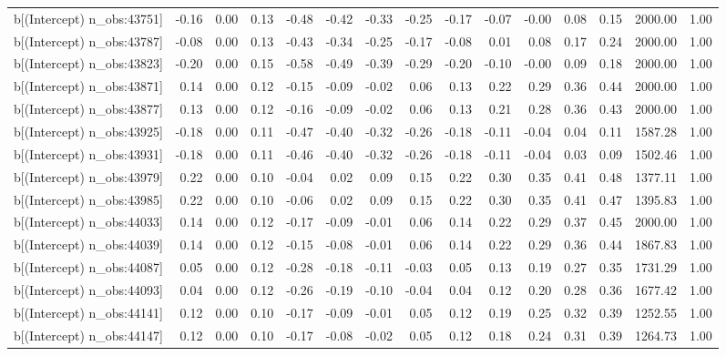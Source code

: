 \begin{table}[ht]
\begin{tabular}{rrrrrrrrrrrrrrr}
  b[(Intercept) n\_obs:43751] & -0.16 & 0.00 & 0.13 & -0.48 & -0.42 & -0.33 & -0.25 & -0.17 & -0.07 & -0.00 & 0.08 & 0.15 & 2000.00 & 1.00 \\ 
  b[(Intercept) n\_obs:43787] & -0.08 & 0.00 & 0.13 & -0.43 & -0.34 & -0.25 & -0.17 & -0.08 & 0.01 & 0.08 & 0.17 & 0.24 & 2000.00 & 1.00 \\ 
  b[(Intercept) n\_obs:43823] & -0.20 & 0.00 & 0.15 & -0.58 & -0.49 & -0.39 & -0.29 & -0.20 & -0.10 & -0.00 & 0.09 & 0.18 & 2000.00 & 1.00 \\ 
  b[(Intercept) n\_obs:43871] & 0.14 & 0.00 & 0.12 & -0.15 & -0.09 & -0.02 & 0.06 & 0.13 & 0.22 & 0.29 & 0.36 & 0.44 & 2000.00 & 1.00 \\ 
  b[(Intercept) n\_obs:43877] & 0.13 & 0.00 & 0.12 & -0.16 & -0.09 & -0.02 & 0.06 & 0.13 & 0.21 & 0.28 & 0.36 & 0.43 & 2000.00 & 1.00 \\ 
  b[(Intercept) n\_obs:43925] & -0.18 & 0.00 & 0.11 & -0.47 & -0.40 & -0.32 & -0.26 & -0.18 & -0.11 & -0.04 & 0.04 & 0.11 & 1587.28 & 1.00 \\ 
  b[(Intercept) n\_obs:43931] & -0.18 & 0.00 & 0.11 & -0.46 & -0.40 & -0.32 & -0.26 & -0.18 & -0.11 & -0.04 & 0.03 & 0.09 & 1502.46 & 1.00 \\ 
  b[(Intercept) n\_obs:43979] & 0.22 & 0.00 & 0.10 & -0.04 & 0.02 & 0.09 & 0.15 & 0.22 & 0.30 & 0.35 & 0.41 & 0.48 & 1377.11 & 1.00 \\ 
  b[(Intercept) n\_obs:43985] & 0.22 & 0.00 & 0.10 & -0.06 & 0.02 & 0.09 & 0.15 & 0.22 & 0.30 & 0.35 & 0.41 & 0.47 & 1395.83 & 1.00 \\ 
  b[(Intercept) n\_obs:44033] & 0.14 & 0.00 & 0.12 & -0.17 & -0.09 & -0.01 & 0.06 & 0.14 & 0.22 & 0.29 & 0.37 & 0.45 & 2000.00 & 1.00 \\ 
  b[(Intercept) n\_obs:44039] & 0.14 & 0.00 & 0.12 & -0.15 & -0.08 & -0.01 & 0.06 & 0.14 & 0.22 & 0.29 & 0.36 & 0.44 & 1867.83 & 1.00 \\ 
  b[(Intercept) n\_obs:44087] & 0.05 & 0.00 & 0.12 & -0.28 & -0.18 & -0.11 & -0.03 & 0.05 & 0.13 & 0.19 & 0.27 & 0.35 & 1731.29 & 1.00 \\ 
  b[(Intercept) n\_obs:44093] & 0.04 & 0.00 & 0.12 & -0.26 & -0.19 & -0.10 & -0.04 & 0.04 & 0.12 & 0.20 & 0.28 & 0.36 & 1677.42 & 1.00 \\ 
  b[(Intercept) n\_obs:44141] & 0.12 & 0.00 & 0.10 & -0.17 & -0.09 & -0.01 & 0.05 & 0.12 & 0.19 & 0.25 & 0.32 & 0.39 & 1252.55 & 1.00 \\ 
  b[(Intercept) n\_obs:44147] & 0.12 & 0.00 & 0.10 & -0.17 & -0.08 & -0.02 & 0.05 & 0.12 & 0.18 & 0.24 & 0.31 & 0.39 & 1264.73 & 1.00 \\ 

\end{tabular}
\end{table}
